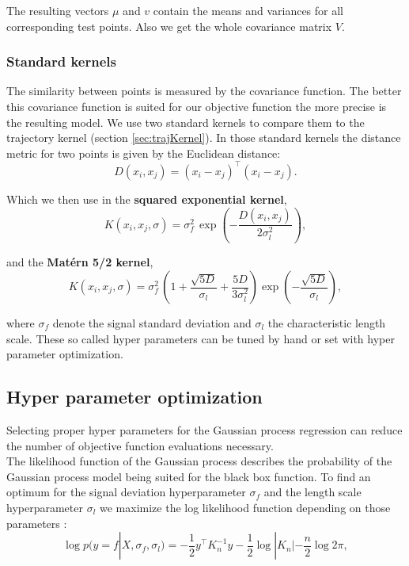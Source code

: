 The resulting vectors $\mu$ and $v$ contain the means and variances for all corresponding test points. Also we get the whole covariance matrix $V$.

\subsubsection{Standard kernels}
The similarity between points is measured by the covariance function. The better this covariance function is suited for our objective function the more precise is the resulting model.
We use two standard kernels \cite{rasmussen2006gaussian} to compare them to the trajectory kernel (section \ref{sec:trajKernel}). In those standard kernels the distance metric for two points is given by the Euclidean distance:
$$D(x_i,x_j) = (x_i-x_j)^\top (x_i-x_j).$$

Which we then use in the \textbf{squared exponential kernel},
$$K(x_i,x_j,\sigma) = \sigma_{f}^{2}\,\exp\left(-\frac{D(x_i,x_j)}{2\sigma_l^2} \right), $$

and the \textbf{Mat\'{e}rn 5/2 kernel},
$$K(x_i,x_j,\sigma) = \sigma_{f}^{2}\,\left(1 + \frac{\sqrt{5 D}}{\sigma_l} + \frac{5 D}{3\sigma_l^2} \right) \exp\left(-\frac{\sqrt{5 D}}{\sigma_l} \right),$$

where $\sigma_f$ denote the signal standard deviation and $\sigma_l$ the characteristic length scale. These so called hyper parameters can be tuned by hand or set with hyper parameter optimization.

\subsection{Hyper parameter optimization}

Selecting proper hyper parameters for the Gaussian process regression can reduce the number of objective function evaluations necessary.\\
The likelihood function of the Gaussian process describes the probability of the Gaussian process model being suited for the black box function. To find an optimum for the signal deviation hyperparameter $\sigma_f$ and the length scale hyperparameter $\sigma_l$ we maximize the log likelihood function depending on those parameters \cite{lizotte2008practical}:
\begin{equation} \label{eq:hypOpt}
    \log p(y = f|X,\sigma_f,\sigma_l) = -\frac{1}{2} y^\top K_n^{-1} y -\frac{1}{2} \log |K_n| -\frac{n}{2}\log 2\pi,
\end{equation}

